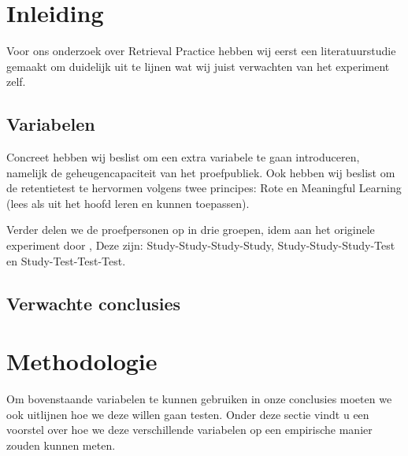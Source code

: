 \documentclass{hogent-article}
\date{\today}
\begin{document}
    \flushbottom
    \maketitle
    \tableofcontents
    \thispagestyle{empty}

    \newpage
    \section{Inleiding}
    
    Voor ons onderzoek over Retrieval Practice hebben wij eerst een literatuurstudie gemaakt om duidelijk uit te lijnen wat wij juist verwachten van het experiment zelf.
    \subsection{Variabelen}
    Concreet hebben wij beslist om een extra variabele te gaan introduceren, namelijk de geheugencapaciteit van het proefpubliek. Ook hebben wij beslist om de retentietest te hervormen volgens twee principes: Rote en Meaningful Learning (lees als uit het hoofd leren en kunnen toepassen).\\
    \par
	\noindent    
    Verder delen we de proefpersonen op in drie groepen, idem aan het originele experiment door \cite{HenryRoediger2006}, Deze zijn: Study-Study-Study-Study, Study-Study-Study-Test  en Study-Test-Test-Test. 
    \subsection{Verwachte conclusies}
    
    \section{Methodologie}
    \label{methodology}
    Om bovenstaande variabelen te kunnen gebruiken in onze conclusies moeten we ook uitlijnen hoe we deze willen gaan testen. Onder deze sectie vindt u een voorstel over hoe we deze verschillende variabelen op een empirische manier zouden kunnen meten.
    
\end{document}
